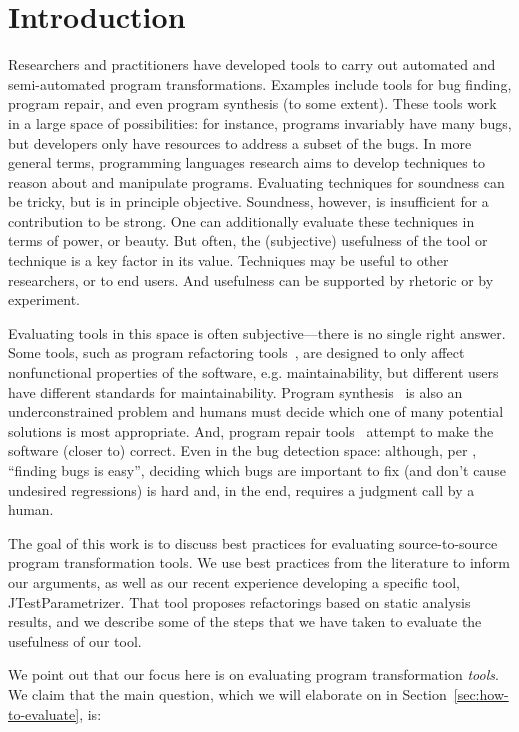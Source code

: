 \section{Introduction}
Researchers and practitioners have developed tools to carry out
automated and semi-automated program transformations.  Examples
include tools for bug finding, program repair, and even 
program synthesis (to some extent). These tools work in a large space of possibilities:
for instance, programs invariably have many bugs, but developers only have resources
to address a subset of the bugs.
In more general terms, programming languages research aims to develop
techniques to reason about and manipulate programs. Evaluating
techniques for soundness can be tricky, but is in principle
objective. Soundness, however, is insufficient for a contribution to
be strong. One can additionally evaluate these techniques in terms of
power, or beauty. But often, the (subjective) usefulness of the tool or technique
is a key factor in its value. Techniques may be useful to other researchers, or to
end users. And usefulness can be supported by rhetoric or by
experiment. 

Evaluating tools in this space is often subjective---there is no
single right answer. Some tools, such as program refactoring tools~\cite{ivers22:_indus_cry_tools_suppor_large_scale_refac},
are designed to only affect nonfunctional properties of the
software, e.g. maintainability, but different users have
different standards for maintainability. Program synthesis~\cite{solar-lezama08:_progr_synth_sketc} is also an
underconstrained problem and humans must decide which one of many
potential solutions is most appropriate. And, program repair
tools~\cite{griesmayer06:_repair_boolean_progr_applic_c} 
attempt to make the software (closer to) correct. Even in 
the bug detection space: although, per 
, ``finding bugs is
easy'', deciding which bugs are
important to fix (and don't cause undesired regressions) is hard and,
in the end, requires a judgment call by a human.

The goal of this work is to discuss best practices for evaluating
source-to-source program transformation tools. We use best practices from the literature
to inform our arguments, as well as our recent experience developing
a specific tool, JTestParametrizer. That tool proposes
refactorings based on static analysis results, and we describe some of the
steps that we have taken to evaluate the usefulness of our tool.

We point out that our focus here is on evaluating program transformation \emph{tools}.
We claim that the main question, which we will elaborate on in Section~\ref{sec:how-to-evaluate}, is:

